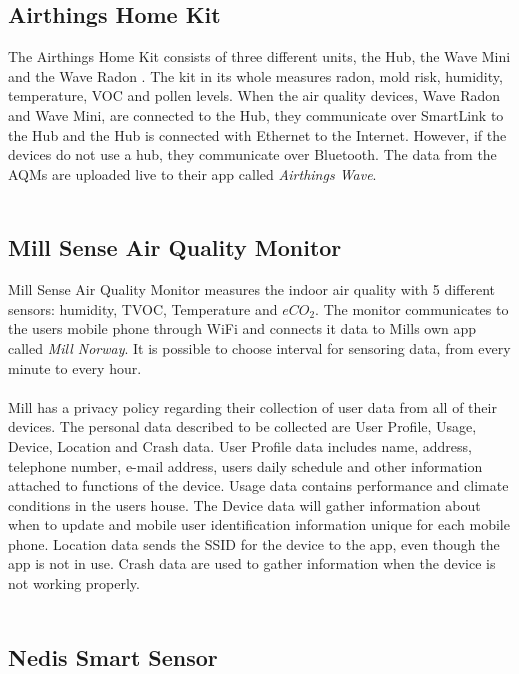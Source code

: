 \subsection{Airthings Home Kit}
The Airthings Home Kit consists of three different units, the Hub, the Wave Mini and the Wave Radon \cite{AirthingsProducts}. The kit in its whole measures radon, mold risk, humidity, temperature, VOC and pollen levels. When the air quality devices, Wave Radon and Wave Mini, are connected to the Hub, they communicate over SmartLink to the Hub and the Hub is connected with Ethernet to the Internet. However, if the devices do not use a hub, they communicate over Bluetooth. The data from the AQMs are uploaded live to their app called \textit{Airthings Wave}. 
\\\\
\subsection{Mill Sense Air Quality Monitor}
Mill Sense Air Quality Monitor measures the indoor air quality with 5 different sensors: humidity, TVOC, Temperature and \(eCO_2\). \cite{Mill} The monitor communicates to the users mobile phone through WiFi and connects it data to Mills own app called \textit{Mill Norway}. It is possible to choose interval for sensoring data, from every minute to every hour. 
\\\\
Mill has a privacy policy regarding their collection of user data from all of their devices. \cite{MillPrivacy} The personal data described to be collected are User Profile, Usage, Device, Location and Crash data. User Profile data includes name, address, telephone number, e-mail address, users daily schedule and other information attached to functions of the device. Usage data contains performance and climate conditions in the users house. The Device data will gather information about when to update and mobile user identification information unique for each mobile phone. Location data sends the SSID for the device to the app, even though the app is not in use. Crash data are used to gather information when the device is not working properly. \cite{MillPrivacy} 
\\\\
\subsection{Nedis Smart Sensor}

